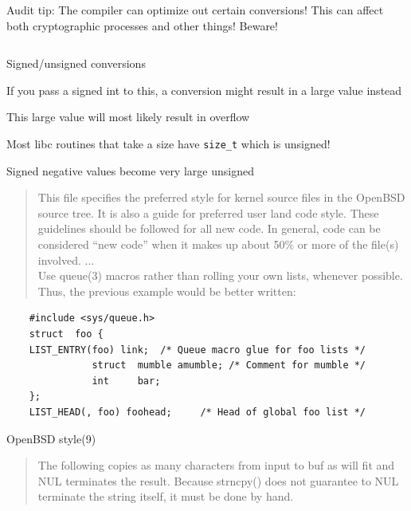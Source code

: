 \documentclass[Screen16to9,17pt]{foils}
\begin{document}
Audit tip: The compiler can optimize out certain conversions! This can affect both cryptographic processes and other things! Beware!





\inputminted{c}{programs/conversion1.c}

\begin{list2}
\item Signed/unsigned conversions
\item If you pass a signed int to this, a conversion might result in a large value instead
\item This large value will most likely result in overflow
\item Most libc routines that take a size have \verb+size_t+ which is unsigned!
\item Signed negative values become very large unsigned
\end{list2}





\begin{quote}
This file specifies the preferred style for kernel source files in the
OpenBSD source tree.  It is also a guide for preferred user land code
style.  These guidelines should be followed for all new code.  In general,
code can be considered ``new code'' when it makes up about 50\% or
more of the file(s) involved. ...\\
Use queue(3) macros rather than rolling your own lists, whenever possible.
Thus, the previous example would be better written:
\end{quote}

\begin{verbatim}
    #include <sys/queue.h>
    struct  foo {
    LIST_ENTRY(foo) link;  /* Queue macro glue for foo lists */
               struct  mumble amumble; /* Comment for mumble */
               int     bar;
    };
    LIST_HEAD(, foo) foohead;     /* Head of global foo list */
\end{verbatim}


OpenBSD style(9)


\begin{quote}
The following copies as many characters from input to buf as will fit and
NUL terminates the result.  Because strncpy() does not guarantee to NUL
terminate the string itself, it must be done by hand.
\end{quote}
\end{document}
